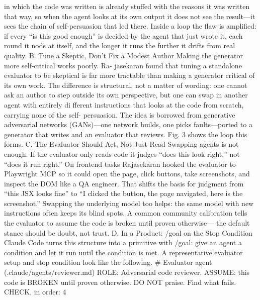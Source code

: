 \documentclass[conference]{IEEEtran}
\begin{document}
in which the code was written is already stuffed with the reasons
it was written that way, so when the agent looks at its own output
it does not see the result—it sees the chain of self-persuasion
that led there. Inside a loop the flaw is amplified: if every “is
this good enough” is decided by the agent that just wrote it, each
round it nods at itself, and the longer it runs the further it drifts
from real quality.
B. Tune a Skeptic, Don’t Fix a Modest Author
Making the generator more self-critical works poorly. Ra-
jasekaran found that tuning a standalone evaluator to be skeptical
is far more tractable than making a generator critical of its own
work. The difference is structural, not a matter of wording: one
cannot ask an author to step outside its own perspective, but one
can swap in another agent with entirely di fferent instructions
that looks at the code from scratch, carrying none of the self-
persuasion. The idea is borrowed from generative adversarial
networks (GANs)—one network builds, one picks faults—ported
to a generator that writes and an evaluator that reviews. Fig. 3
shows the loop this forms.
C. The Evaluator Should Act, Not Just Read
Swapping agents is not enough. If the evaluator only reads
code it judges “does this look right,” not “does it run right.” On
frontend tasks Rajasekaran hooked the evaluator to Playwright
MCP so it could open the page, click buttons, take screenshots,
and inspect the DOM like a QA engineer. That shifts the basis for
judgment from “this JSX looks fine” to “I clicked the button, the
page navigated, here is the screenshot.” Swapping the underlying
model too helps: the same model with new instructions often
keeps its blind spots. A common community calibration tells the
evaluator to assume the code is broken until proven otherwise—
the default stance should be doubt, not trust.
D. In a Product: /goal on the Stop Condition
Claude Code turns this structure into a primitive with /goal:
give an agent a condition and let it run until the condition is met.
A representative evaluator setup and stop condition look like the
following.
\# Evaluator agent (.claude/agents/reviewer.md)
ROLE: Adversarial code reviewer.
ASSUME: this code is BROKEN until proven otherwise.
DO NOT praise. Find what fails.
CHECK, in order:
4



\end{document}
